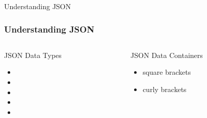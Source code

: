 \documentclass{beamer}\usepackage[]{graphicx}\usepackage[]{color}
\begin{document}

\begin{frame}
 \begin{center}
  \Huge{\textcolor{mandarina}{Understanding JSON}}
 \end{center}
\end{frame}


\begin{frame}
\frametitle{Understanding JSON}

\begin{columns}[t]
\begin{column}{0.3\textwidth}
 \begin{block}{JSON Data Types}
  \begin{itemize}
   \item[] 
   \item[] 
   \item[] 
   \item[] 
   \item[] 
  \end{itemize}
 \end{block}
\end{column}

\begin{column}{0.4\textwidth}
 \begin{block}{JSON Data Containers}
  \begin{itemize}
   \item[] square brackets \highcode{[ ]}
   \item[] curly brackets \highcode{\{ \}}
  \end{itemize}
 \end{block}
\end{column}
\end{columns}

\end{frame}

\end{document}
